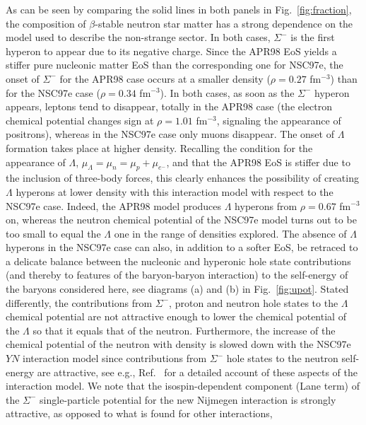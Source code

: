 As can be seen by comparing the solid lines in both
panels in Fig.\  \ref{fig:fraction},
the composition of $\beta$-stable neutron star matter has a strong
dependence on the model used to describe the non-strange sector. 
In both cases, $\Sigma^-$ is
the first hyperon to appear due to its negative charge. Since the 
APR98 EoS yields a stiffer pure nucleonic matter EoS than the
corresponding one for NSC97e, the onset of $\Sigma^-$ for
the APR98 case occurs
at a smaller density ($\rho=0.27$
fm$^{-3}$) than for the NSC97e case ($\rho=0.34$ fm$^{-3}$). In
both cases, as soon as the $\Sigma^-$ hyperon appears, 
leptons tend to disappear,
totally in the APR98 case (the electron chemical potential changes
sign at $\rho=1.01$
fm$^{-3}$, signaling the appearance of positrons), whereas in the NSC97e case only muons disappear. 
The onset of
$\Lambda$ 
formation takes place at higher density.
Recalling the condition for the appearance of $\Lambda$,
$\mu_{\Lambda}=\mu_{n}=\mu_{p}+\mu_{e^-}$, and that the APR98 EoS is
stiffer due to the inclusion of three-body forces, this clearly enhances
the possibility of creating $\Lambda$ hyperons at lower
density with this interaction model
with respect to the NSC97e case. Indeed,
the APR98 model produces $\Lambda$ hyperons from
$\rho=0.67$ fm$^{-3}$ on, whereas the neutron chemical
potential of the NSC97e model turns out to be too small to equal
the $\Lambda$ one in the range of densities explored.   
The absence of $\Lambda$ hyperons in the NSC97e case
can also, in addition to a softer EoS, be retraced to a delicate
balance between the nucleonic and hyperonic hole state contributions
(and thereby to features of the baryon-baryon interaction)
to the self-energy of the baryons considered here, see diagrams (a) and (b)
in Fig.\ \ref{fig:upot}. Stated differently, the contributions from 
$\Sigma^-$, proton and neutron hole states to the $\Lambda$ chemical
potential are not attractive enough to lower the chemical potential of
the $\Lambda$ so that it equals that of the neutron. Furthermore,
the increase of the chemical potential of the neutron with
density is slowed down with the NSC97e $YN$ interaction model since
contributions from $\Sigma^-$ hole states to the neutron self-energy are
attractive, see e.g., Ref.\ \cite{isaac99} for a detailed account of these
aspects of the interaction model. 
We note that the 
isospin-dependent component (Lane term) of the        
$\Sigma^-$ single-particle potential for the
new Nijmegen interaction \cite{sr99} is strongly attractive,
as opposed to what is found \cite{dabro99} for other interactions,
